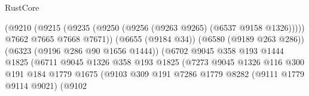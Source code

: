 \begin{lexlean}{RustCore}
\begin{coremodule}
{\begin{coremodule}
{{{{{{{{{{{{{{{{{{{{{{{{{{{{{{{{{{{{{{{{{{{{{                                                  (@9210
                                                    (@9215
                                                      (@9235
                                                        (@9250
                                                          (@9256
                                                            (@9263 @9265)
                                                            (@6537 @9158 @1326)))))
                                                    @7662
                                                    @7665
                                                    @7668
                                                    @7671))
                                                (@6655 (@9184 @34))
                                                (@6580 (@9189 @263 @286))
                                                (@6323 (@9196 @286 @90 @1656 @1444))
                                                (@6702
                                                  @9045
                                                  @358
                                                  @193
                                                  @1444
                                                  @1825
                                                  (@6711
                                                    @9045
                                                    @1326
                                                    @358
                                                    @193
                                                    @1825
                                                    (@7273
                                                      @9045
                                                      @1326
                                                      @116
                                                      @300
                                                      @191
                                                      @184
                                                      @1779
                                                      @1675
                                                      (@9103
                                                        @309
                                                        @191
                                                        @7286
                                                        @1779
                                                        @8282
                                                        (@9111 @1779 @9114 @9021)
                                                        (@9102
}}}}}}}}}}}}}}}}}}}}}}}}}}}}}}}}}}}}}}}}}}}}}
\end{coremodule}}
\end{coremodule}
\end{lexlean}
